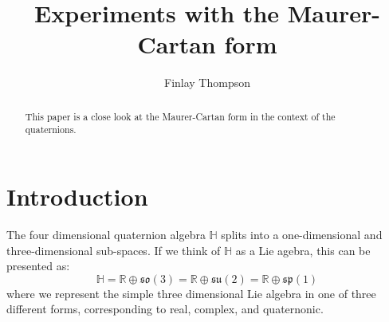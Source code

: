 \documentclass{amsart}
\title{Experiments with the Maurer-Cartan form}
\author{Finlay Thompson}
\newcommand{\HH}{\mathbb{H}}
\newcommand{\RR}{\mathbb{R}}
\newcommand{\so}{\mathfrak{so}}
\newcommand{\su}{\mathfrak{su}}
\renewcommand{\sp}{\mathfrak{sp}}
\begin{document}
\begin{abstract}
  This paper is a close look at the Maurer-Cartan form in the context of the quaternions.
\end{abstract}

\maketitle

\section{Introduction}

The four dimensional quaternion algebra $\HH$ splits into a one-dimensional and three-dimensional sub-spaces.
If we think of $\HH$ as a Lie agebra, this can be presented as:
$$\HH = \RR \oplus \so(3) = \RR \oplus \su(2) = \RR \oplus \sp(1) $$
where we represent the simple three dimensional Lie algebra in one of three different forms, corresponding to real, complex, and quaternonic.
\end{document}
